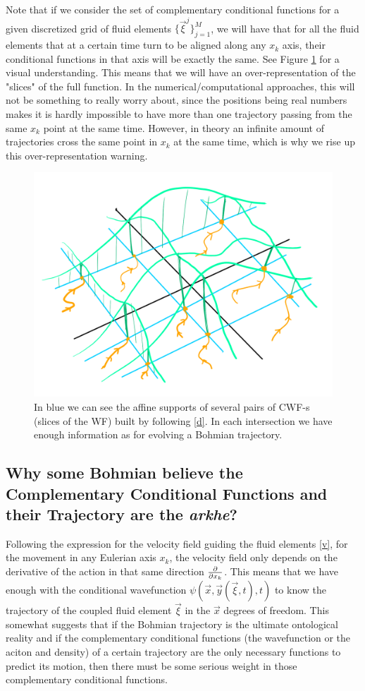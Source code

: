 \documentclass[11pt, a4paper]{article} %
\begin{document}
Note that if we consider the set of complementary conditional functions for a given discretized grid of fluid elements $\{\vec{\xi}^j\}_{j=1}^M$, we will have that for all the fluid elements that at a certain time turn to be aligned along any $x_k$ axis, their conditional functions in that axis will be exactly the same. See Figure \ref{fig:over} for a visual understanding. This means that we will have an over-representation of the "slices" of the full function. In the numerical/computational approaches, this will not be something to really worry about, since the positions being real numbers makes it is hardly impossible to have more than one trajectory passing from the same $x_k$ point at the same time. However, in theory an infinite amount of trajectories cross the same point in $x_k$ at the same time, which is why we rise up this over-representation warning.



\begin{figure}[h!]
  \centering
    \includegraphics[width=0.65\linewidth]{many_bohmian.png}
  \caption{In blue we can see the affine supports of several pairs of CWF-s (slices of the WF) built by following \eqref{d}. In each intersection we have enough information as for evolving a Bohmian trajectory. }
  \label{fig:over}
\end{figure}

\subsection*{Why some Bohmian believe the Complementary Conditional Functions and their Trajectory are the {\em arkhe}?}

Following the expression for the velocity field guiding the fluid elements \eqref{v}, for the movement in any Eulerian axis $x_k$, the velocity field only depends on the derivative of the action in that same direction $\pdv{}{x_k}$. This means that we have enough with the conditional wavefunction $\psi(\vec{x},\vec{y}(\vec{\xi},t),t)$ to know the trajectory of the coupled fluid element $\vec{\xi}$ in the $\vec{x}$ degrees of freedom. This somewhat suggests that if the Bohmian trajectory is the ultimate ontological reality and if the complementary conditional functions (the wavefunction or the aciton and density) of a certain trajectory are the only necessary functions to predict its motion, then there must be some serious weight in those complementary conditional functions. 
\end{document}
